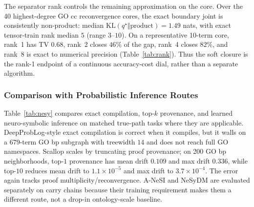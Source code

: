 \documentclass[letterpaper]{article}
\begin{document}
The separator rank controls the remaining approximation on the core. Over the 40 highest-degree GO cc reconvergence cores, the exact boundary joint is consistently non-product: median $\mathrm{KL}(q^\star\Vert\text{product})=1.49$ nats, with exact tensor-train rank median $5$ (range $3$--$10$). On a representative 10-term core, rank~1 has TV $0.68$, rank~2 closes $46\%$ of the gap, rank~4 closes $82\%$, and rank~8 is exact to numerical precision (Table~\ref{tab:rank}). Thus the soft closure is the rank-1 endpoint of a continuous accuracy-cost dial, rather than a separate algorithm.

\begin{table}[t]\centering
\caption{Component analysis on 12 matched GO cc reconvergent subgraphs. Rows isolate method components rather than changing the ontology task.}
\label{tab:components}
\footnotesize
\setlength{\tabcolsep}{2pt}
\end{table}

\subsubsection{Comparison with Probabilistic Inference Routes}
Table~\ref{tab:nesy} compares exact compilation, top-$k$ provenance, and learned neuro-symbolic inference on matched true-path tasks where they are applicable. DeepProbLog-style exact compilation is correct when it compiles, but it walls on a 679-term GO bp subgraph with treewidth $14$ and does not reach full GO namespaces. Scallop scales by truncating proof provenance; on 200 GO bp neighborhoods, top-$1$ provenance has mean drift $0.109$ and max drift $0.336$, while top-$10$ reduces mean drift to $1.1\times10^{-5}$ and max drift to $3.7\times10^{-4}$. The error again tracks proof multiplicity/reconvergence. A-NeSI and NeSyDM are evaluated separately on carry chains because their training requirement makes them a different route, not a drop-in ontology-scale baseline.
\end{document}
